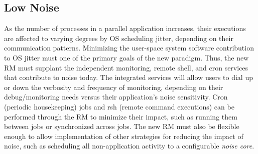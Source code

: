 \documentclass{article}
\newcommand{\ngrm}{NGRM}
\begin{document}
%
%

\subsection{Low Noise}

As the number of processes in a parallel application increases, 
their executions are affected to varying degrees by OS
scheduling jitter, depending on their communication patterns. Minimizing
the user-space system software contribution to OS jitter must one 
of the primary goals of the new paradigm.  Thus, the new RM must supplant
the independent monitoring, remote shell, and cron
services that contribute to noise today. The integrated services will
allow users to dial up or down the verbosity and frequency of monitoring,
depending on their debug/monitoring needs versus their application's noise
sensitivity. Cron (periodic housekeeping) jobs and rsh (remote command
executions) can be performed through the RM to minimize their impact,
such as running them between jobs or synchronized across jobs. 
The new RM must also be flexible enough to allow implementation of other
strategies for reducing the impact of noise, such as scheduling all
non-application activity to a configurable {\em noise core}.
\end{document}
